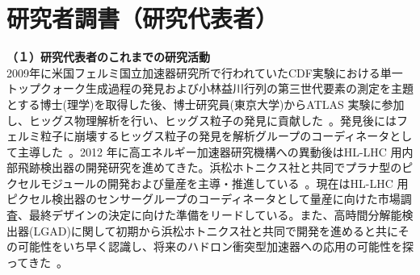 
\section{研究者調書（研究代表者）}

\renewcommand{\研究者氏名}{中村浩二}
\renewcommand{\研究者氏名ふりがな}{なかむら　こうじ}
\renewcommand{\研究者生年月日の年}{1981}
\renewcommand{\研究者生年月日の月}{8}
\renewcommand{\研究者生年月日の日}{4}
\renewcommand{\研究者年齢}{41}
\renewcommand{\研究者所属機関部局職}{\small{高エネルギー加速器研究機構・素粒子原子核研究所・助教}}	%
\renewcommand{\研究者学位}{博士(理学)}


	\noindent
	\textbf{（１）研究代表者のこれまでの研究活動}\\
2009年に米国フェルミ国立加速器研究所で行われていたCDF実験における単一トップクォーク生成過程の発見および小林益川行列の第三世代要素の測定を主題とする博士(理学)を取得した後、博士研究員(東京大学)からATLAS 実験に参加し、ヒッグス物理解析を行い、ヒッグス粒子の発見に貢献した~\cite{higgsobs}。発見後にはフェルミ粒子に崩壊するヒッグス粒子の発見を解析グループのコーディネータとして主導した~\cite{higgstau,higgshunting2015}。2012 年に高エネルギー加速器研究機構への異動後はHL-LHC 用内部飛跡検出器の開発研究を進めてきた。浜松ホトニクス社と共同でプラナ型のピクセルモジュールの開発および量産を主導・推進している~\cite{atlaspixel1,atlaspixel2}。現在はHL-LHC 用ピクセル検出器のセンサーグループのコーディネータとして量産に向けた市場調査、最終デザインの決定に向けた準備をリードしている。また、高時間分解能検出器(LGAD)に関して初期から浜松ホトニクス社と共同で開発を進めると共にその可能性をいち早く認識し、将来のハドロン衝突型加速器への応用の可能性を探ってきた~\cite{lgadvertex2022,lgadnim2023,vertex2020}。
\\

